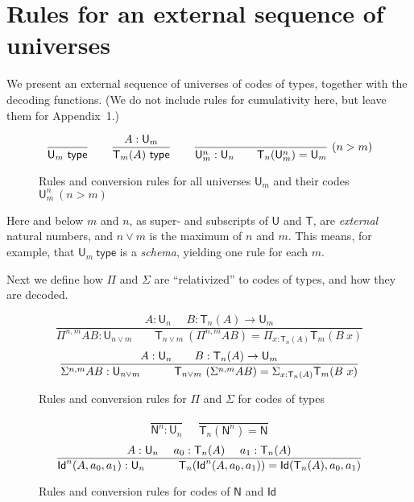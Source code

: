 \documentclass[11pt,a4paper]{article}
\theoremstyle{definition}
\newcommand{\Id}{\mathsf{Id}}
\newcommand{\NN}{\mathsf{N}}
\newcommand{\UU}{\mathsf{U}}
\newcommand{\type}{\mathsf{type}}
\newcommand{\mypi}[3]{\Pi_{#1:#2}#3}
\newcommand{\mysig}[3]{\Sigma_{#1:#2}#3}
\newcommand{\sapp}[2]{{#1(#2)}} %
\newcommand{\Idapp}[3]{\sapp{\Id}{#1,#2,#3}}
\newcommand{\Idnapp}[4]{\sapp{\Id^#4}{#1,#2,#3}}
\newcommand{\T}{\mathsf{T}}
\begin{document}
\section{Rules for an external sequence of universes}\label{sec:external}


We present an external sequence of universes of codes of types, together
with the decoding functions. (We do not include rules for cumulativity here, but leave them for Appendix~1.)

\begin{figure}[H]
  \caption{Rules and conversion rules for all universes $\UU_m$ and their codes $\UU^{n}_{m}~(n>m)$}\label{fig:typeU}
$$
\frac{}{\UU_m~\type}~~~~~~
\frac{A:\UU_{m}}{\T_{m}(A)~\type}~~~~~~
\frac{}{\UU^{n}_{m}:\UU_{n}~~~~~~\T_{n}({\UU^{n}_{m}}) = \UU_{m}}{~(n>m)}
\belowdisplayshortskip 0pt
$$
\end{figure}

Here and below $m$ and $n$, as super- and subscripts of $\UU$ and $\T$,
are \emph{external} natural numbers, and $n \vee m$ is the
maximum of $n$ and $m$. This means, for example, that $\UU_m~\type$ is
a \emph{schema}, yielding one rule for each $m$.

Next we define how $\Pi$ and $\Sigma$ are ``relativized'' to
codes of types, and how they are decoded.

\begin{figure}[H]
  \caption{Rules and conversion rules for $\Pi$ and $\Sigma$ for codes of types}\label{fig:PiSigU}
$$
\frac{A:\UU_{n}~~~~~~B:\T_{n}(A)\rightarrow \UU_{m}}
     {\Pi^{n,m} A B:\UU_{n\vee m}~~~~~~~~~
      \T_{n\vee m}~(\Pi^{n,m} A B) = \mypi{x}{\T_{n}(A)}{ \T_{m}(B~x)}}
$$
$$
\frac{A:\UU_{n}~~~~~~B:\T_{n}(A)\rightarrow \UU_{m}}
     {\Sigma^{n,m} A B:\UU_{n\vee m}~~~~~~~~~
     \T_{n\vee m}~(\Sigma^{n,m} A B) = \mysig {x}{\T_{n}(A)}{ \T_{m}(B~x)}}
\belowdisplayshortskip -1pt
$$
\end{figure}

\begin{figure}[H]
\caption{Rules and conversion rules for codes of $\NN$ and $\Id$}\label{fig:NIdU}
$$
\frac{}{\NN^{n}:\UU_{n}}~~~~~~\frac{}{\T_{n}(\NN^{n}) = \NN}
$$
$$
\frac{A:\UU_n~~~~a_0:\T_n(A)~~~~a_1:\T_n(A)}
{\Idnapp{A}{a_0}{a_1}{n}:\UU_n ~~~~~~~~~ \T_n(\Idnapp{A}{a_0}{a_1}{n}) = \Idapp{{\T_n(A)}}{a_0}{a_1} }
\belowdisplayshortskip 1pt
$$
\end{figure}
\end{document}
